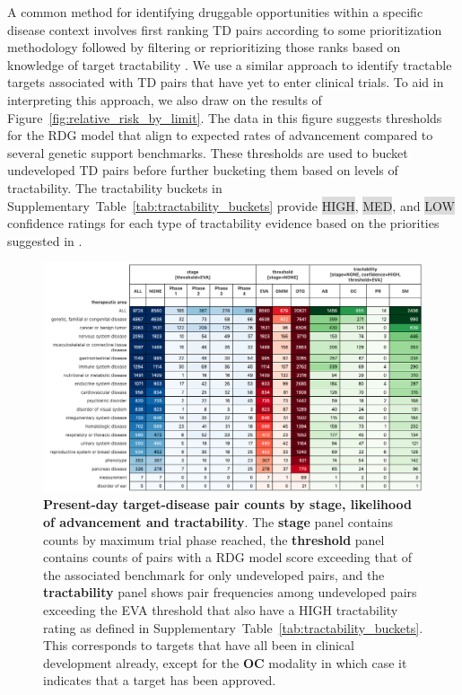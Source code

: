\documentclass{article}
\begin{document}
A common method for identifying druggable opportunities within a specific disease context involves first ranking TD pairs according to some prioritization methodology followed by filtering or reprioritizing those ranks based on knowledge of target tractability \cite{PMID:28356508,PMID:35401535,PMID:31253980}. We use a similar approach to identify tractable targets associated with TD pairs that have yet to enter clinical trials. To aid in interpreting this approach, we also draw on the results of Figure~\ref{fig:relative_risk_by_limit}. The data in this figure suggests thresholds for the RDG model that align to expected rates of advancement compared to several genetic support benchmarks. These thresholds are used to bucket undeveloped TD pairs before further bucketing them based on levels of tractability. The tractability buckets in Supplementary~Table~\ref{tab:tractability_buckets} provide \colorbox{Gainsboro}{HIGH}, \colorbox{Gainsboro}{MED}, and \colorbox{Gainsboro}{LOW} confidence ratings for each type of tractability evidence based on the priorities suggested in \cite{OTTractability}.

\begin{figure}[!htb]
  \centering
  \captionsetup{width=.9\linewidth}
  \includegraphics[width=1\textwidth]{opportunity_summary.png}
  \caption{
    \textbf{Present-day target-disease pair counts by stage, likelihood of advancement and tractability}. The \textbf{stage} panel contains counts by maximum trial phase reached, the \textbf{threshold} panel contains counts of pairs with a RDG model score exceeding that of the associated benchmark for only undeveloped pairs, and the \textbf{tractability} panel shows pair frequencies among undeveloped pairs exceeding the EVA threshold that also have a HIGH tractability rating as defined in Supplementary~Table~\ref{tab:tractability_buckets}. This corresponds to targets that have all been in clinical development already, except for the \textbf{OC} modality in which case it indicates that a target has been approved. 
  }
  \label{fig:opportunity_summary}
\end{figure}
\end{document}
